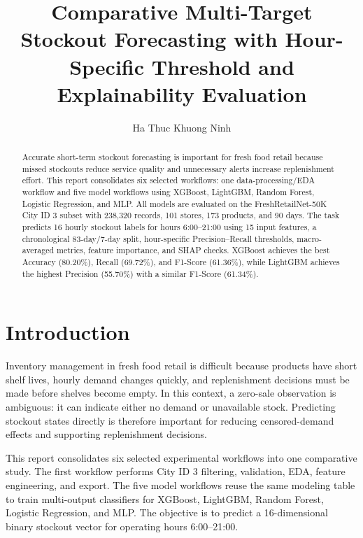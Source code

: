 \documentclass{llncs}
\begin{document}
\pagestyle{empty}

\title{Comparative Multi-Target Stockout Forecasting with Hour-Specific Threshold and Explainability Evaluation}
\author{Ha Thuc Khuong Ninh}

\maketitle
\thispagestyle{empty}

\begin{abstract}
Accurate short-term stockout forecasting is important for fresh food retail because missed stockouts reduce service quality and unnecessary alerts increase replenishment effort. This report consolidates six selected workflows: one data-processing/EDA workflow and five model workflows using XGBoost, LightGBM, Random Forest, Logistic Regression, and MLP. All models are evaluated on the FreshRetailNet-50K City ID 3 subset with 238,320 records, 101 stores, 173 products, and 90 days. The task predicts 16 hourly stockout labels for hours 6:00--21:00 using 15 input features, a chronological 83-day/7-day split, hour-specific Precision--Recall thresholds, macro-averaged metrics, feature importance, and SHAP checks. XGBoost achieves the best Accuracy (80.20\%), Recall (69.72\%), and F1-Score (61.36\%), while LightGBM achieves the highest Precision (55.70\%) with a similar F1-Score (61.34\%).

\end{abstract}

\section{Introduction}
Inventory management in fresh food retail is difficult because products have short shelf lives, hourly demand changes quickly, and replenishment decisions must be made before shelves become empty. In this context, a zero-sale observation is ambiguous: it can indicate either no demand or unavailable stock. Predicting stockout states directly is therefore important for reducing censored-demand effects and supporting replenishment decisions.

This report consolidates six selected experimental workflows into one comparative study. The first workflow performs City ID 3 filtering, validation, EDA, feature engineering, and export. The five model workflows reuse the same modeling table to train multi-output classifiers for XGBoost, LightGBM, Random Forest, Logistic Regression, and MLP. The objective is to predict a 16-dimensional binary stockout vector for operating hours 6:00--21:00.
\end{document}
